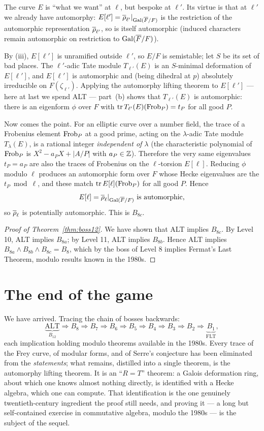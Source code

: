 \documentclass[11pt]{article}
\begin{document}
The curve $E$ is ``what we want'' at $\ell$, but bespoke at $\ell'$. Its virtue
is that at $\ell'$ we already have automorphy: $E[\ell']=\overline{\rho}_{\ell'}|_{\operatorname{Gal}(\overline{F}/F)}$
is the restriction of the automorphic representation $\overline{\rho}_{\ell'}$, so is
itself automorphic (induced characters remain automorphic on restriction to
$\operatorname{Gal}(\overline{F}/F)$).

By (iii), $E[\ell']$ is unramified outside $\ell'$, so $E/F$ is semistable; let
$S$ be its set of bad places. The $\ell'$-adic Tate module $T_{\ell'}(E)$ is an
$S$-minimal deformation of $E[\ell']$, and $E[\ell']$ is automorphic and (being
dihedral at $p$) absolutely irreducible on $F(\zeta_{\ell'})$. Applying the
automorphy lifting theorem to $E[\ell']$ --- here at last we spend ALT ---
part~(b) shows that $T_{\ell'}(E)$ is automorphic: there is an eigenform $\phi$
over $F$ with $\operatorname{tr} T_{\ell'}(E)(\operatorname{Frob}_P)=t_P$ for all good $P$.

Now comes the point. For an elliptic curve over a number field, the trace of a
Frobenius element $\operatorname{Frob}_P$ at a good prime, acting on the $\lambda$-adic Tate
module $T_\lambda(E)$, is a rational integer \emph{independent of $\lambda$}
(the characteristic polynomial of $\operatorname{Frob}_P$ is $X^2-a_PX+|A/P|$ with
$a_P\in\mathbb{Z}$). Therefore the very same eigenvalues $t_P=a_P$ are also the traces
of Frobenius on the $\ell$-torsion $E[\ell]$. Reducing $\phi$ modulo $\ell$
produces an automorphic form over $F$ whose Hecke eigenvalues are the $t_P
\bmod\ell$, and these match $\operatorname{tr} E[\ell](\operatorname{Frob}_P)$ for all good $P$. Hence
\[
  E[\ell]=\overline{\rho}_\ell|_{\operatorname{Gal}(\overline{F}/F)}\ \text{is automorphic,}
\]
so $\overline{\rho}_\ell$ is potentially automorphic. This is $B_{8c}$.

\begin{proof}[Proof of Theorem~\ref{thm:boss12}]
We have shown that ALT implies $B_{8c}$. By Level 10, ALT implies $B_{8a}$; by
Level 11, ALT implies $B_{8b}$. Hence ALT implies
$B_{8a}\wedge B_{8b}\wedge B_{8c}=B_8$, which by the boss of Level 8 implies
Fermat's Last Theorem, modulo results known in the 1980s.
\end{proof}

\section*{The end of the game}

We have arrived. Tracing the chain of bosses backwards:
\[
  \underbrace{\text{ALT}}_{B_{12}}
  \Rightarrow B_8 \Rightarrow B_7 \Rightarrow B_6 \Rightarrow B_5
  \Rightarrow B_4 \Rightarrow B_3 \Rightarrow B_2 \Rightarrow \underbrace{B_1}_{\text{FLT}},
\]
each implication holding modulo theorems available in the 1980s. Every trace of
the Frey curve, of modular forms, and of Serre's conjecture has been eliminated
from the \emph{statements}; what remains, distilled into a single theorem, is
the automorphy lifting theorem. It is an ``$R=T$'' theorem: a Galois deformation
ring, about which one knows almost nothing directly, is identified with a Hecke
algebra, which one can compute. That identification is the one genuinely
twentieth-century ingredient the proof still needs, and proving it --- a long
but self-contained exercise in commutative algebra, modulo the 1980s --- is the
subject of the sequel.
\end{document}

